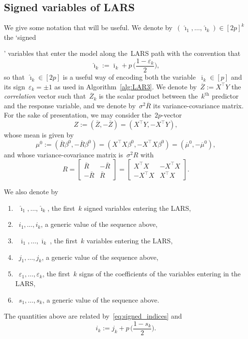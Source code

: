 \documentclass[final,numbib]{imaiai}%
\numberwithin{equation}{section}
\def\eq{\begin{equation}}
\def\qe{\end{equation}}
\renewcommand{\bar}{\overline}
\renewcommand{\hat}{\widehat}
\def\\bUnif{\text{\bUnif}}
\newcommand{\<}{\langle}
\renewcommand{\>}{\rangle}
\newcommand{\1}{\mathds{1}}
\begin{document}
{{\subsection{Signed variables of LARS}
\label{sec:signednotation}
We give some notation that will be useful.
We denote by~$(\,\hat \imath_1,\ldots,\hat \imath_k)\in[2p]^k$ the `signed}' variables that enter the model along the~LARS path with the convention that
\eq
\label{eq:signed_indices}
\hat \imath_k:=\bar \imath_k+p\,\Big(\frac{1-\varepsilon_k}2\Big),
\qe
so that~$\hat \imath_k\in[2p]$ is a useful way of encoding both the variable~$\bar \imath_k\in[p]$ and its sign~$\varepsilon_k=\pm1$ as used in Algorithm~\ref{alg:LAR3}.
We denote by~$\bar Z:=X^\top Y$ the {\it correlation} vector such that~$\bar Z_k$ is the scalar product between the~$k^{\text{th}}$ predictor and the response variable, and we denote by~$\sigma^2\bar R$ its variance-covariance matrix.
For the sake of presentation, we may consider the~$2p$-vector
\eq
\label{eq:defBarZ}
Z:=(\bar Z,-\bar Z)=(X^\top Y ,-X^\top Y ),
\qe
whose mean is given by
\eq
\label{e:mu0}
\mu^0:=(\bar R\beta^0,-\bar R\beta^0)=(X^\top X\beta^0,-X^\top X\beta^0)=(\bar\mu^0,-\bar\mu^0),
\qe
and whose variance-covariance matrix is~$\sigma^2 R$ with 
\eq
\label{eq:white}
R
=\left[\begin{array}{cc} \bar R & -\bar R \\-\bar R & \bar R\end{array}\right]
=\left[\begin{array}{cc} X^\top X & -X^\top X \\-X^\top X & X^\top X\end{array}\right].
\qe

\noindent
 We also denote by
\begin{enumerate}
\item[$\circ$]~$\hat \imath_1,\ldots,  \hat \imath_k$,  the first~$k$ signed variables entering the LARS,
\item[$\circ$]~$ i_1,\ldots,i_k$, a generic value of the sequence above,%
\item[$\circ$]~$ \bar \imath_1 ,\ldots, \bar \imath_k~$, the first~$k$ variables entering the LARS,
\item[$\circ$]~$j_1, \ldots,j_k$, a generic value of the sequence above,%
\item[$\circ$]~$\varepsilon_1, \ldots,  \varepsilon_k$, the first~$k$ signs of the coefficients of the variables entering in the LARS,
\item[$\circ$]~$s_1,\ldots,s_k$, a generic value of the sequence above.
\end{enumerate}
\noindent
 The quantities above are related by~\eqref{eq:signed_indices} and
 \eq
\label{e:findices}
i_k:=j_k+p\,\Big(\frac{1-s_k}2\Big).
\qe

}
\end{document}
